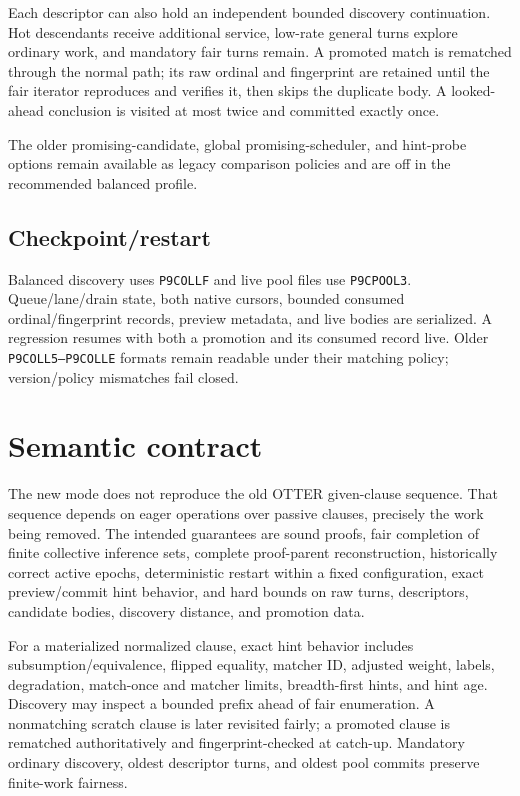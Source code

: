 \documentclass[11pt]{article}
\newcommand{\setting}[1]{\texttt{#1}}
\begin{document}
Each descriptor can also hold an independent bounded discovery continuation.
Hot descendants receive additional service, low-rate general turns explore
ordinary work, and mandatory fair turns remain.  A promoted match is rematched
through the normal path; its raw ordinal and fingerprint are retained until
the fair iterator reproduces and verifies it, then skips the duplicate body.
A looked-ahead conclusion is visited at most twice and committed exactly once.

The older promising-candidate, global promising-scheduler, and hint-probe
options remain available as legacy comparison policies and are off in the
recommended balanced profile.

\subsection{Checkpoint/restart}

Balanced discovery uses \setting{P9COLLF} and live pool files use
\setting{P9CPOOL3}.  Queue/lane/drain state, both native cursors, bounded
consumed ordinal/fingerprint records, preview metadata, and live bodies are
serialized.  A regression resumes with both a promotion and its consumed
record live.  Older \setting{P9COLL5--P9COLLE} formats remain readable under
their matching policy; version/policy mismatches fail closed.

\section{Semantic contract}

The new mode does not reproduce the old OTTER given-clause sequence.  That
sequence depends on eager operations over passive clauses, precisely the work
being removed.  The intended guarantees are sound proofs, fair completion of
finite collective inference sets, complete proof-parent reconstruction,
historically correct active epochs, deterministic restart within a fixed
configuration, exact preview/commit hint behavior, and hard bounds on raw
turns, descriptors, candidate bodies, discovery distance, and promotion data.

For a materialized normalized clause, exact hint behavior includes
subsumption/equivalence, flipped equality, matcher ID, adjusted weight, labels,
degradation, match-once and matcher limits, breadth-first hints, and hint age.
Discovery may inspect a bounded prefix ahead of fair enumeration.  A
nonmatching scratch clause is later revisited fairly; a promoted clause is
rematched authoritatively and fingerprint-checked at catch-up.  Mandatory
ordinary discovery, oldest descriptor turns, and oldest pool commits preserve
finite-work fairness.
\end{document}
